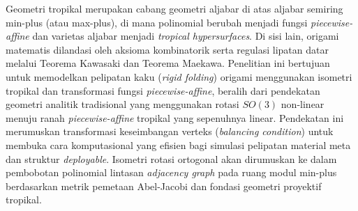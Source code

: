 Geometri tropikal merupakan cabang geometri aljabar di atas aljabar semiring min-plus (atau max-plus), di mana polinomial berubah menjadi fungsi \textit{piecewise-affine} dan varietas aljabar menjadi \textit{tropical hypersurfaces}. Di sisi lain, origami matematis dilandasi oleh aksioma kombinatorik serta regulasi lipatan datar melalui Teorema Kawasaki dan Teorema Maekawa. Penelitian ini bertujuan untuk memodelkan pelipatan kaku (\textit{rigid folding}) origami menggunakan isometri tropikal dan transformasi fungsi \textit{piecewise-affine}, beralih dari pendekatan geometri analitik tradisional yang menggunakan rotasi $SO(3)$ non-linear menuju ranah \textit{piecewise-affine} tropikal yang sepenuhnya linear. Pendekatan ini merumuskan transformasi keseimbangan verteks (\textit{balancing condition}) untuk membuka cara komputasional yang efisien bagi simulasi pelipatan material meta dan struktur \textit{deployable}. Isometri rotasi ortogonal akan dirumuskan ke dalam pembobotan polinomial lintasan \textit{adjacency graph} pada ruang modul min-plus berdasarkan metrik pemetaan Abel-Jacobi dan fondasi geometri proyektif tropikal.

